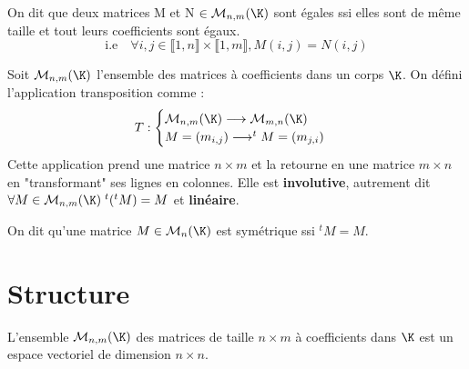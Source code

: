 \begin{proposition}
    On dit que deux matrices M et N $ \in \mathcal{M}_{n,m}(\K)$ sont égales ssi elles sont de même taille et 
    tout leurs coefficients sont égaux. 
        \[ \text{i.e} \quad \forall i,j \in \llbracket 1, n \rrbracket \times \llbracket 1, m \rrbracket, M(i,j) = N(i,j) \]  
\end{proposition}

\begin{definition}[Transposition]
    Soit $ \mathcal{M}_{n,m}(\K)$ l'ensemble des matrices à coefficients dans un corps $\K$. 
    On défini l'application transposition comme : 
        \[ T : 
            \begin{cases}
                \mathcal{M}_{n,m}(\K) \longrightarrow \mathcal{M}_{m,n}(\K) \\ 
                M = (m_{i,j}) \longrightarrow ^t M = (m_{j,i})
            \end{cases} \]
    Cette application prend une matrice $ n \times m$ et la retourne en une matrice $ m \times n $ en "transformant"
    ses lignes en colonnes. 
    Elle est \textbf{involutive}, autrement dit $ \forall M \in \mathcal{M}_{n,m}(\K) \; ^t (^t M) = M$ 
    et \textbf{linéaire}. 
\end{definition}

\begin{definition}
    On dit qu'une matrice $M \in \mathcal{M}_{n}(\K)$ est symétrique ssi $^tM = M$. 
\end{definition}



\section{Structure}

L'ensemble $ \mathcal{M}_{n,m}(\K)$ des matrices de taille $ n \times m $ à coefficients dans $\K$ est 
un espace vectoriel de dimension $ n \times n$. 